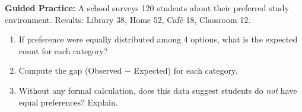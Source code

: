 \documentclass[10pt]{article}
\begin{document}
\begin{practicebox}
\textbf{Guided Practice:} A school surveys 120 students about their preferred study
environment. Results: Library 38, Home 52, Caf\'e 18, Classroom 12.

\begin{enumerate}
  \item If preference were equally distributed among 4 options, what is the
        expected count for each category?

  \item Compute the gap (Observed $-$ Expected) for each category.

  \item Without any formal calculation, does this data suggest students do
        \emph{not} have equal preferences? Explain.
\end{enumerate}
\end{practicebox}
\end{document}
